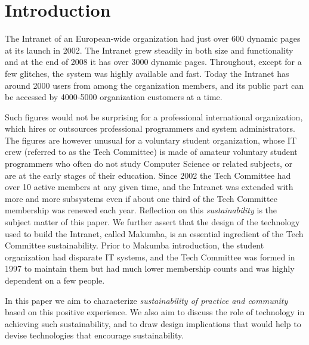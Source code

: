 \documentclass{acm_proc_article-sp}
\begin{document}

\section{Introduction}\label{sec:introduction}
The Intranet of an European-wide organization had just over 600 dynamic pages at its launch in 2002. The Intranet grew steadily in both size and functionality
 and at the end of 2008 it has over 3000 dynamic pages. Throughout, except for a few glitches, the system was highly available and fast. Today the Intranet has around 2000 users from among the organization members, and its public part can be accessed by 4000-5000 organization customers at a time.

Such figures would not be surprising for a professional international organization, which hires or outsources professional programmers and system administrators. 
The figures are however unusual for a voluntary student organization, whose IT crew (referred to as the Tech Committee) is made of amateur voluntary student programmers who often do not study Computer Science or related subjects, or are at the early stages of their education.  
Since 2002  the Tech Committee had over 10 active members at any given time, and the Intranet was extended with more and more subsystems even if about one third of the Tech Committee membership was renewed each year. Reflection on this {\it sustainability} is the subject matter of this paper. We further assert that the design of the technology used to build the Intranet, called Makumba, is an essential ingredient of the Tech Committee sustainability.
Prior to Makumba introduction, the student organization had disparate IT systems, and the Tech Committee was formed in 1997 to maintain them but had much lower membership counts and was highly dependent on a few people.

In this paper we aim to characterize {\it sustainability of practice and community} based on this positive experience. We also aim to discuss the role of technology in achieving such sustainability, and to draw design implications that would help to devise technologies that encourage sustainability. 
\end{document}

